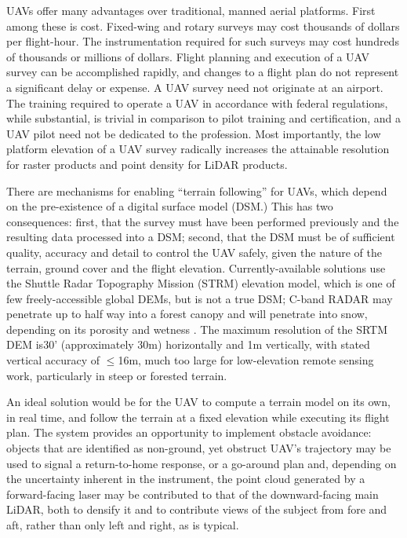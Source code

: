 \documentclass[10pt,a4paper]{report}
\begin{document}
UAVs offer many advantages over traditional, manned aerial platforms. First among these is cost. Fixed-wing and rotary surveys may cost thousands of dollars per flight-hour. The instrumentation required for such surveys may cost hundreds of thousands or millions  of dollars. Flight planning and execution of a UAV survey can be accomplished rapidly, and changes to a flight plan do not represent a significant delay or expense. A UAV survey need not originate at an airport. The training required to operate a UAV in accordance with federal regulations, while substantial, is trivial in comparison to pilot training and certification, and a UAV pilot need not be dedicated to the profession. Most importantly, the low platform elevation of a UAV survey radically increases the attainable resolution for raster products and point density for LiDAR products.

There are mechanisms for enabling “terrain following” for UAVs, which depend on the pre-existence of a digital surface model (DSM.) This has two consequences: first, that the survey must have been performed previously and the resulting data processed into a DSM; second, that the DSM must be of sufficient quality, accuracy and detail to control the UAV safely, given the nature of the terrain, ground cover and the flight elevation. Currently-available solutions use the Shuttle Radar Topography Mission (STRM) elevation model, which is one of few freely-accessible global DEMs, but is not a true DSM; C-band RADAR may penetrate up to half way into a forest canopy \cite{Carabajal2005} and will penetrate into snow, depending on its porosity and wetness \cite{Tighe2009}. The maximum resolution of the SRTM DEM is30' (approximately 30m) horizontally and 1m vertically, with stated vertical accuracy of $\leq$16m, much too large for low-elevation remote sensing work, particularly in steep or forested terrain.  

An ideal solution would be for the UAV to compute a terrain model on its own, in real time, and follow the terrain at a fixed elevation while executing its flight plan. The system provides an opportunity to implement obstacle avoidance: objects that are identified as non-ground, yet obstruct UAV’s trajectory may be used to signal a return-to-home response, or a go-around plan and, depending on the uncertainty inherent in the instrument, the point cloud generated by a forward-facing laser may be contributed to that of the downward-facing main LiDAR, both to densify it and to contribute views of the subject from fore and aft, rather than only left and right, as is typical. 
\end{document}
